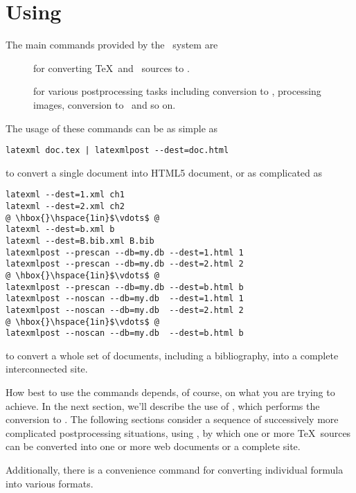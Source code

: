 \documentclass{book}
\begin{document}
\chapter{Using \LaTeXML}\label{usage}
The main commands provided by the \LaTeXML\ system are
\begin{description}
\item[] for converting \TeX\ and \BibTeX\ sources to \XML.
\item[] for various postprocessing tasks including
conversion to \HTML, processing images, conversion to \MathML\ and so on.
\end{description}
\noindent The usage of these commands can be as simple as
\begin{lstlisting}[style=shell]
latexml doc.tex | latexmlpost --dest=doc.html
\end{lstlisting}
\noindent to convert a single document into \textsc{HTML5} document,
 or as complicated as
\begin{lstlisting}[style=shell]
latexml --dest=1.xml ch1
latexml --dest=2.xml ch2
@ \hbox{}\hspace{1in}$\vdots$ @
latexml --dest=b.xml b
latexml --dest=B.bib.xml B.bib
latexmlpost --prescan --db=my.db --dest=1.html 1
latexmlpost --prescan --db=my.db --dest=2.html 2
@ \hbox{}\hspace{1in}$\vdots$ @
latexmlpost --prescan --db=my.db --dest=b.html b
latexmlpost --noscan --db=my.db  --dest=1.html 1
latexmlpost --noscan --db=my.db  --dest=2.html 2
@ \hbox{}\hspace{1in}$\vdots$ @
latexmlpost --noscan --db=my.db  --dest=b.html b
\end{lstlisting}
\noindent to convert a whole set of documents, including a bibliography,
into a complete interconnected site.

How best to use the commands depends, of course, on what you
are trying to achieve.  In the next section, we'll describe
the use of , which performs the conversion to \XML.
The following sections consider a sequence of
successively more complicated postprocessing situations,
using ,
by which one or more \TeX\ sources can be converted into
one or more web documents or a complete site.

Additionally, there is a convenience command 
for converting individual formula into various formats.

\end{document}
